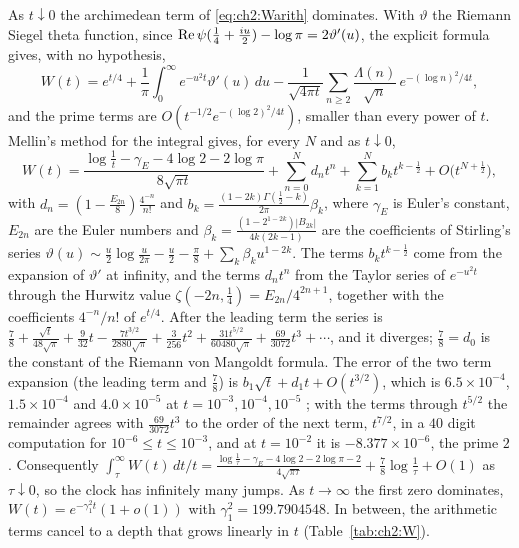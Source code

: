 \begin{resultpar}
As $t\downarrow0$ the archimedean term of \eqref{eq:ch2:Warith} dominates. With $\vartheta$ the Riemann Siegel theta function, since $\operatorname{Re}\psi(\frac14+\frac{iu}2)-\log\pi=2\vartheta'(u)$, the explicit formula gives, with no hypothesis,
\[
W(t)=e^{t/4}+\frac1\pi\int_0^\infty e^{-u^2t}\vartheta'(u)\,du-\frac1{\sqrt{4\pi t}}\sum_{n\ge2}\frac{\Lambda(n)}{\sqrt n}\,e^{-(\log n)^2/4t},
\]
and the prime terms are $O(t^{-1/2}e^{-(\log2)^2/4t})$, smaller than every power of $t$. Mellin's method for the integral \cite[Section 2.5]{DLMF} gives, for every $N$ and as $t\downarrow0$,
\[
W(t)=\frac{\log\frac1t-\gamma_E-4\log2-2\log\pi}{8\sqrt{\pi t}}+\sum_{n=0}^Nd_nt^n+\sum_{k=1}^Nb_kt^{k-\frac12}+O\big(t^{N+\frac12}\big),
\]
with $d_n=(1-\frac{E_{2n}}8)\frac{4^{-n}}{n!}$ and $b_k=\frac{(1-2k)\Gamma(\frac12-k)}{2\pi}\beta_k$, where $\gamma_E$ is Euler's constant, $E_{2n}$ are the Euler numbers and $\beta_k=\frac{(1-2^{1-2k})|B_{2k}|}{4k(2k-1)}$ are the coefficients of Stirling's series $\vartheta(u)\sim\frac u2\log\frac u{2\pi}-\frac u2-\frac\pi8+\sum_k\beta_ku^{1-2k}$. The terms $b_kt^{k-\frac12}$ come from the expansion of $\vartheta'$ at infinity, and the terms $d_nt^n$ from the Taylor series of $e^{-u^2t}$ through the Hurwitz value $\zeta(-2n,\frac14)=E_{2n}/4^{2n+1}$, together with the coefficients $4^{-n}/n!$ of $e^{t/4}$. After the leading term the series is $\frac78+\frac{\sqrt t}{48\sqrt\pi}+\frac9{32}t-\frac{7t^{3/2}}{2880\sqrt\pi}+\frac3{256}t^2+\frac{31t^{5/2}}{60480\sqrt\pi}+\frac{69}{3072}t^3+\cdots$, and it diverges; $\frac78=d_0$ is the constant of the Riemann von Mangoldt formula. The error of the two term expansion (the leading term and $\frac78$) is $b_1\sqrt t+d_1t+O(t^{3/2})$, which is $6.5\times10^{-4}$, $1.5\times10^{-4}$ and $4.0\times10^{-5}$ at $t=10^{-3},10^{-4},10^{-5}$ \cite[Corollary 5.5]{P17}; with the terms through $t^{5/2}$ the remainder agrees with $\frac{69}{3072}t^3$ to the order of the next term, $t^{7/2}$, in a $40$ digit computation for $10^{-6}\le t\le10^{-3}$, and at $t=10^{-2}$ it is $-8.377\times10^{-6}$, the prime $2$. Consequently $\int_\tau^\infty W(t)\,dt/t=\frac{\log\frac1\tau-\gamma_E-4\log2-2\log\pi-2}{4\sqrt{\pi\tau}}+\frac78\log\frac1\tau+O(1)$ as $\tau\downarrow0$, so the clock has infinitely many jumps. As $t\to\infty$ the first zero dominates, $W(t)=e^{-\gamma_1^2t}(1+o(1))$ with $\gamma_1^2=199.7904548$. In between, the arithmetic terms cancel to a depth that grows linearly in $t$ (Table~\ref{tab:ch2:W}).\label{tx3:res:wzero}
\end{resultpar}

